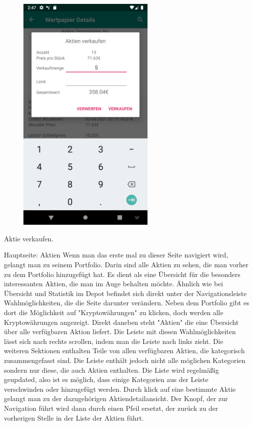 \documentclass[10pt]{scrartcl}
\begin{document}
\begin{figure}[H]
	\centering
	\includegraphics[width=0.6\textwidth]{Bilder/Applikation/AktieVerkaufen.png}
\end{figure}
Aktie verkaufen.

Hauptseite: Aktien
Wenn man das erste mal zu dieser Seite navigiert wird, gelangt man zu seinem Portfolio. Darin sind alle Aktien zu sehen, die man vorher zu dem Portfolio hinzugefügt hat. Es dient als eine Übersicht für die besonders interessanten Aktien, die man im Auge behalten möchte. Ähnlich wie bei Übersicht und Statistik im Depot befindet sich direkt unter der Navigationsleiste Wahlmöglichkeiten, die die Seite darunter verändern. Neben dem Portfolio gibt es dort die Möglichkeit auf "Kryptowährungen" zu klicken, doch werden alle Kryptowährungen angezeigt. Direkt daneben steht "Aktien" die eine Übersicht über alle verfügbaren Aktion liefert. Die Leiste mit diesen Wahlmöglichkeiten lässt sich nach rechts scrollen, indem man die Leiste nach links zieht. Die weiteren Sektionen enthalten Teile von allen verfügbaren Aktien, die kategorisch zusammengefasst sind. Die Leiste enthält jedoch nicht alle möglichen Kategorien sondern nur diese, die auch Aktien enthalten. Die Liste wird regelmäßig geupdated, also ist es möglich, dass einige Kategorien aus der Leiste verschwinden oder hinzugefügt werden.
Durch klick auf eine bestimmte Aktie gelangt man zu der dazugehörigen Aktiendetailansicht. Der Knopf, der zur Navigation führt wird dann durch einen Pfeil ersetzt, der zurück zu der vorherigen Stelle in der Liste der Aktien führt.
\end{document}
